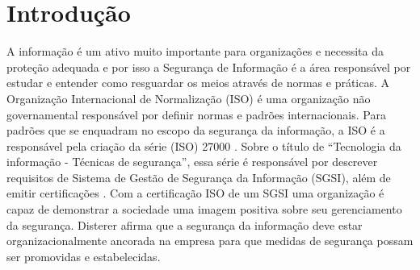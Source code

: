 \chapter{\label{chap:intro}Introdução}
%
%



%
%
%
%
%
   

A informação é um ativo muito importante para organizações e necessita da proteção adequada e por isso a Segurança de Informação é a área responsável por estudar e entender como resguardar os meios através de normas e práticas. A Organização Internacional de Normalização (ISO) é uma organização não governamental responsável por definir normas e padrões internacionais. Para padrões que se enquadram no escopo da segurança da informação, a ISO é a responsável pela criação da série (ISO) 27000 \cite{caio2019}. Sobre o título de “Tecnologia da informação - Técnicas de segurança”, essa série é responsável por descrever requisitos de Sistema de Gestão de Segurança da Informação (SGSI), além de emitir certificações \cite{disterer2013}. Com a certificação ISO de um SGSI uma organização é capaz de demonstrar a sociedade uma imagem positiva sobre seu gerenciamento da segurança. Disterer \cite{disterer2013} afirma que a segurança da informação deve estar organizacionalmente ancorada na empresa para que medidas de segurança possam ser promovidas e estabelecidas. 

